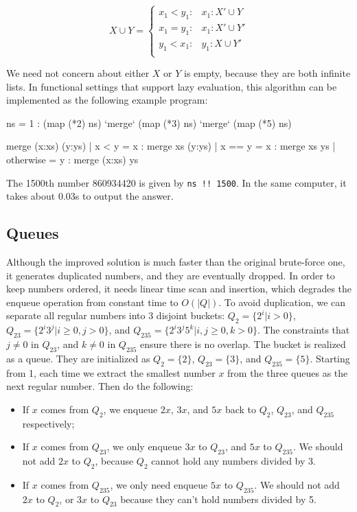 \documentclass[b5paper]{article}
\begin{document}
\[
X \cup Y = \begin{cases}
  x_1 < y_1: & x_1 : X' \cup Y \\
  x_1 = y_1: & x_1 : X' \cup Y' \\
  y_1 < x_1: & y_1 : X \cup Y' \\
\end{cases}
\]

We need not concern about either $X$ or $Y$ is empty, because they are both infinite lists. In functional settings that support lazy evaluation, this algorithm can be implemented as the following example program:

\begin{Haskell}
ns = 1 : (map (*2) ns) `merge` (map (*3) ns) `merge` (map (*5) ns)

merge (x:xs) (y:ys) | x < y = x : merge xs (y:ys)
                    | x == y = x : merge xs ys
                    | otherwise = y : merge (x:xs) ys
\end{Haskell}

The 1500th number 860934420 is given by \texttt{ns !! 1500}. In the same computer, it takes about 0.03s to output the answer.

\subsection{Queues}
Although the improved solution is much faster than the original brute-force one, it generates duplicated numbers, and they are eventually dropped. In order to keep numbers ordered, it needs linear time scan and insertion, which degrades the enqueue operation from constant time to $O(|Q|)$. To avoid duplication, we can separate all regular numbers into 3 disjoint buckets: $Q_2 = \{2^i | i > 0\}$, $Q_{23} = \{ 2^i3^j | i \geq 0, j > 0 \}$, and $Q_{235} = \{ 2^i3^j5^k | i,j \geq 0, k > 0\}$. The constraints that $j \neq 0$ in $Q_{23}$, and $k \neq 0$ in $Q_{235}$ ensure there is no overlap. The bucket is realized as a queue. They are initialized as $Q_2 = \{ 2 \}$, $Q_{23} = \{ 3\}$, and $Q_{235} = \{ 5 \}$. Starting from 1, each time we extract the smallest number $x$ from the three queues as the next regular number. Then do the following:

\begin{itemize}
\item If $x$ comes from $Q_2$, we enqueue $2x$, $3x$, and $5x$ back to $Q_2$, $Q_{23}$, and $Q_{235}$ respectively;
\item If $x$ comes from $Q_{23}$, we only enqueue $3x$ to $Q_{23}$, and $5x$ to $Q_{235}$. We should not add $2x$ to $Q_2$, because $Q_2$ cannot hold any numbers divided by 3.
\item If $x$ comes from $Q_{235}$, we only need enqueue $5x$ to $Q_{235}$. We should not add $2x$ to $Q_2$, or $3x$ to $Q_{23}$ because they can't hold numbers divided by 5.
\end{itemize}
\end{document}
